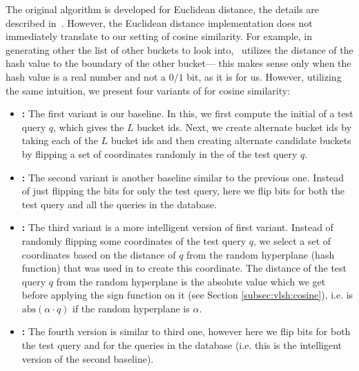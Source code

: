 The original \mblshf algorithm is developed for Euclidean distance, the details
are described in~\cite{LvVLDB07}. However, the Euclidean distance implementation does not immediately translate to our setting of cosine similarity. 
For example, in generating other the list of other buckets to look into,~\cite{LvVLDB07} utilizes the distance of the hash value 
to the boundary of the other bucket--- this
makes sense only when the hash value is a real number and not a $0/1$ bit, as it is for us. 
However, utilizing the same intuition, we present four variants  
of \mblshf for cosine similarity:
\begin{itemize}
\item {\bf \rflipq:} The first variant is our baseline. In this, we first compute the initial \lsh of a test query $q$, which gives the $L$ bucket ids.  
Next, we create alternate bucket ids by taking each of the $L$ bucket ids and then creating alternate candidate buckets by flipping a 
set of coordinates randomly in the \lsh of the test query $q$.  
\item {\bf \rflipb:} The second variant is another baseline similar to the previous one. Instead of just flipping the bits for only the test query, 
here we flip bits for both the test query and all the queries in the database. 
\item {\bf \dflipq:} The third variant is a more intelligent version of first variant. Instead of randomly flipping some coordinates
of the test query $q$, 
we select a set of coordinates based on the distance of $q$ from the random hyperplane (hash function) 
that was used in to create this coordinate. 
The distance of the test query $q$ from the random hyperplane is the absolute value which we get before applying the sign function on it 
(see Section \ref{subsec:vlsh:cosine}), i.e. is $ \mathrm{abs}(\alpha \cdot q)$ if the random hyperplane is $\alpha$. 
\item {\bf \dflipb:} The fourth version is similar to third one, however 
here we flip bits for both the test query and for the queries in the database (i.e. this is the intelligent version of the second baseline). 
\end{itemize}




